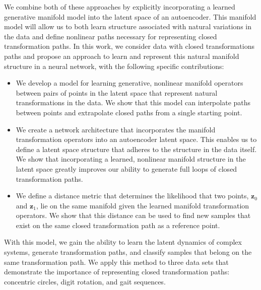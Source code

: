 \documentclass[letterpaper]{article} %
\newcommand{\vtr}[1]{\ensuremath{\mathbf{#1}}}
\begin{document}
We combine both of these approaches by explicitly incorporating a learned generative manifold model into the latent space of an autoencoder. This manifold model will allow us to both learn structure associated with natural variations in the data and define nonlinear paths necessary for representing closed transformation paths. In this work, we consider data with closed transformations paths and propose an approach to learn and represent this natural manifold structure in a neural network, with the following specific contributions:
\begin{itemize}
    \item We develop a model for learning generative, nonlinear manifold operators between pairs of points in the latent space that represent natural transformations in the data. We show that this model can interpolate paths between points and extrapolate closed paths from a single starting point.
    \item We create a network architecture that incorporates the manifold transformation operators into an autoencoder latent space. This enables us to define a latent space structure that adheres to the structure in the data itself. We show that incorporating a learned, nonlinear manifold structure in the latent space greatly improves our ability to generate full loops of closed transformation paths.
    \item We define a distance metric that determines the likelihood that two points, $\vtr{z}_0$ and $\vtr{z}_1$, lie on the same manifold given the learned manifold transformation operators. We show that this distance can be used to find new samples that exist on the same closed transformation path as a reference point.\end{itemize}

With this model, we gain the ability to learn the latent dynamics of complex systems, generate transformation paths, and classify samples that belong on the same transformation path. We apply this method to three data sets that demonstrate the importance of representing closed transformation paths: concentric circles, digit rotation, and gait sequences.
\end{document}
